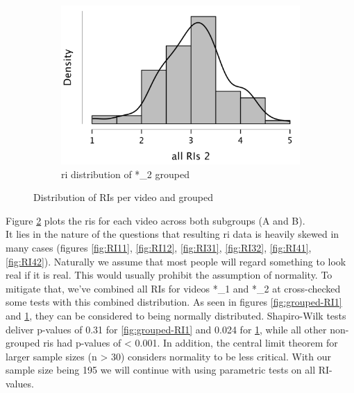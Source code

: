 \documentclass[
  a4paper,  %
  twoside,  %
  bibliography=totoc,
  headsepline,
  cleardoublepage=empty,
  parskip=half,
  draft=false
]{scrbook}
\begin{document}
\begin{figure}[h]
\begin{subfigure}{0.4\textwidth}
    \includegraphics[width=\linewidth]{graphics/images/statistics/RIs/RI2_all.png}
    \caption{\gls{ri} distribution of *\_2 grouped}
    \label{fig:grouped-RI2}
  \end{subfigure}
  \caption{Distribution of RIs per video and grouped}
  \label{fig:all-RIs}
\end{figure}

 Figure \ref{fig:all-RIs} plots the \gls{ri}s for each video across both subgroups (A and B). \\
 It lies in the nature of the questions that resulting \gls{ri} data is heavily skewed in many cases (figures \ref{fig:RI11}, \ref{fig:RI12}, \ref{fig:RI31}, \ref{fig:RI32}, \ref{fig:RI41}, \ref{fig:RI42}). Naturally we assume that most people will regard something to look real if it is real. This would usually prohibit the assumption of normality. To mitigate that, we've combined all RIs for videos *\_1 and *\_2 at cross-checked some tests with this combined distribution. As seen in figures \ref{fig:grouped-RI1} and \ref{fig:grouped-RI2}, they can be considered to being normally distributed. Shapiro-Wilk tests deliver p-values of 0.31 for \ref{fig:grouped-RI1} and 0.024 for \ref{fig:grouped-RI2}, while all other non-grouped \gls{ri}s had p-values of < 0.001. In addition, the central limit theorem for larger sample sizes (n > 30) considers normality to be less critical. With our sample size being 195 we will continue with using parametric tests on all RI-values.
\end{document}
